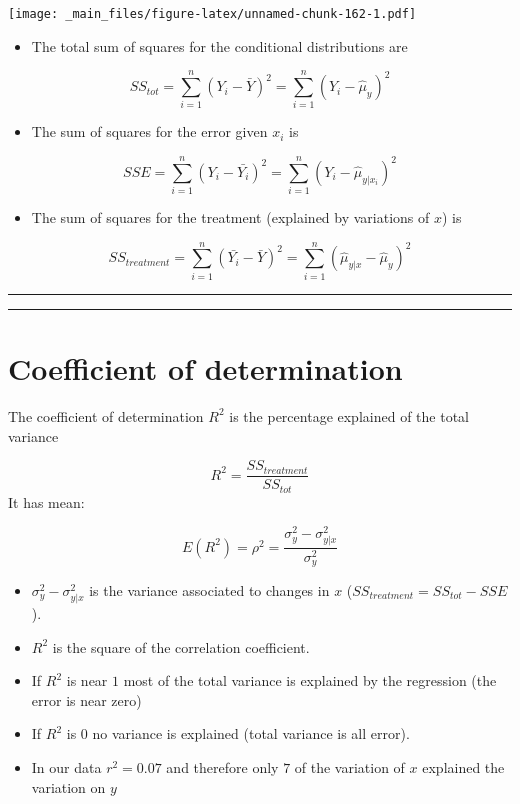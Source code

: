 \documentclass[
]{book}
\providecommand{\tightlist}{%
  \setlength{\itemsep}{0pt}\setlength{\parskip}{0pt}}
\begin{document}
\texttt{[image: \_main\_files/figure-latex/unnamed-chunk-162-1.pdf]}

\begin{itemize}
\tightlist
\item
  The total sum of squares for the conditional distributions are
\end{itemize}

\[SS_{tot}=\sum_{i=1}^n(Y_i-\bar{Y})^2=\sum_{i=1}^n(Y_i -\hat{\mu}_y)^2\]

\begin{itemize}
\tightlist
\item
  The sum of squares for the error given \(x_i\) is
\end{itemize}

\[SSE=\sum_{i=1}^n(Y_i-\bar{Y_i})^2=\sum_{i=1}^n(Y_i-\hat{\mu}_{y|x_i})^2\]

\begin{itemize}
\tightlist
\item
  The sum of squares for the treatment (explained by variations of \(x\)) is
\end{itemize}

\[SS_{treatment}=\sum_{i=1}^n(\bar{Y_i}-\bar{Y})^2=\sum_{i=1}^n(\hat{\mu}_{y|x} -\hat{\mu}_y)^2\]

\begin{center}\rule{0.5\linewidth}{0.5pt}\end{center}

\begin{center}\rule{0.5\linewidth}{0.5pt}\end{center}

\hypertarget{coefficient-of-determination}{%
\section{Coefficient of determination}\label{coefficient-of-determination}}

The coefficient of determination \(R^2\) is the percentage explained of the total variance

\[R^2=\frac{SS_{treatment}}{SS_{tot}}\]
It has mean:

\[E(R^2)=\rho^2=\frac{\sigma^2_{y}-\sigma^2_{y|x}}{\sigma^2_{y}}\]

\begin{itemize}
\item
  \(\sigma_y^2-\sigma^2_{y|x}\) is the variance associated to changes in \(x\) (\(SS_{treatment}=SS_{tot} - SSE\)).
\item
  \(R^2\) is the square of the correlation coefficient.
\item
  If \(R^2\) is near \(1\) most of the total variance is explained by the regression (the error is near zero)
\item
  If \(R^2\) is \(0\) no variance is explained (total variance is all error).
\item
  In our data \(r^2=0.07\) and therefore only \(7%
  \) of the variation of \(x\) explained the variation on \(y\)
\end{itemize}
\end{document}

